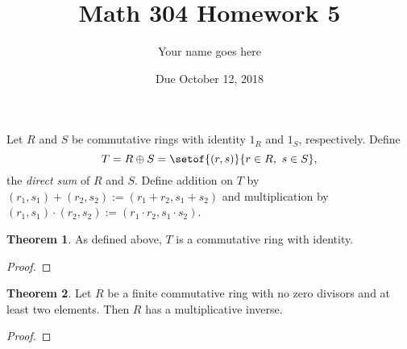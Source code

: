 \documentclass[11pt]{article}		%
\title{Math 304 Homework 5}
\author{Your name goes here}
\date{Due October 12, 2018}
\theoremstyle{definition}
\newtheorem{theorem}{Theorem}
\begin{document}
\maketitle


 Let $R$ and $S$ be commutative rings with identity $1_R$ and $1_S$, respectively. 
 Define
	\[
		T = R\oplus S = \setof{(r,s)}{r\in R,\ s\in S},
	\]
	the \emph{direct sum} of $R$ and $S$.
	Define addition on $T$ by $(r_1,s_1) + (r_2,s_2) := (r_1 + r_2, s_1 + s_2)$ and multiplication by $(r_1,s_1) \cdot (r_2,s_2) := (r_1 \cdot r_2, s_1 \cdot s_2)$. 
	
	\begin{theorem}
		As defined above, $T$ is a commutative ring with identity.
	\end{theorem}

	\begin{proof}
		
	\end{proof}
	
	
	
	
	
	\begin{theorem}
		Let $R$ be a finite commutative ring with no zero divisors and at least two elements.
		Then $R$ has a multiplicative inverse.
	\end{theorem}
	
	\begin{proof}
		
	\end{proof}
\end{document}
